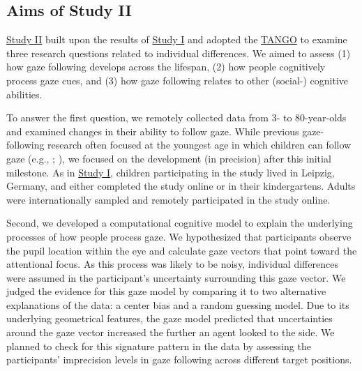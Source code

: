\documentclass[
]{scrbook}
\begin{document}
\subsection{Aims of Study II}\label{aims-studyII}

\hyperref[studyII]{Study II} built upon the results of \hyperref[studyI]{Study I} and adopted the \hyperref[acronyms_TANGO]{TANGO} to examine three research questions related to individual differences. We aimed to assess (1) how gaze following develops across the lifespan, (2) how people cognitively process gaze cues, and (3) how gaze following relates to other (social-) cognitive abilities.

To answer the first question, we remotely collected data from 3- to 80-year-olds and examined changes in their ability to follow gaze. While previous gaze-following research often focused at the youngest age in which children can follow gaze (e.g., ; ), we focused on the development (in precision) after this initial milestone. As in \hyperref[studyI]{Study I}, children participating in the study lived in Leipzig, Germany, and either completed the study online or in their kindergartens. Adults were internationally sampled and remotely participated in the study online.

Second, we developed a computational cognitive model to explain the underlying processes of how people process gaze. We hypothesized that participants observe the pupil location within the eye and calculate gaze vectors that point toward the attentional focus. As this process was likely to be noisy, individual differences were assumed in the participant's uncertainty surrounding this gaze vector. We judged the evidence for this gaze model by comparing it to two alternative explanations of the data: a center bias and a random guessing model. Due to its underlying geometrical features, the gaze model predicted that uncertainties around the gaze vector increased the further an agent looked to the side. We planned to check for this signature pattern in the data by assessing the participants' imprecision levels in gaze following across different target positions.
\end{document}

